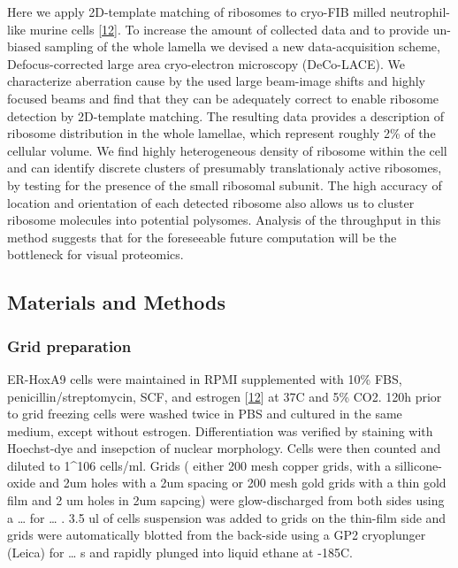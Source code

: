 \documentclass[
]{article}
\begin{document}
Here we apply 2D-template matching of ribosomes to cryo-FIB milled
neutrophil-like murine cells {[}\protect\hyperlink{ref-1B9Vt9eYu}{12}{]}. To increase the
amount of collected data and to provide un-biased sampling of the whole lamella
we devised a new data-acquisition scheme, Defocus-corrected large area
cryo-electron microscopy (DeCo-LACE). We characterize aberration cause by the
used large beam-image shifts and highly focused beams and find that they can be
adequately correct to enable ribosome detection by 2D-template matching. The
resulting data provides a description of ribosome distribution in the whole
lamellae, which represent roughly 2\% of the cellular volume. We find highly
heterogeneous density of ribosome within the cell and can identify discrete
clusters of presumably translationaly active ribosomes, by testing for the
presence of the small ribosomal subunit. The high accuracy of location and
orientation of each detected ribosome also allows us to cluster ribosome
molecules into potential polysomes. Analysis of the throughput in this method
suggests that for the foreseeable future computation will be the bottleneck for
visual proteomics.

\hypertarget{materials-and-methods}{%
\subsection{Materials and Methods}\label{materials-and-methods}}

\hypertarget{grid-preparation}{%
\subsubsection{Grid preparation}\label{grid-preparation}}

ER-HoxA9 cells were maintained in RPMI supplemented with 10\% FBS,
penicillin/streptomycin, SCF, and estrogen {[}\protect\hyperlink{ref-1B9Vt9eYu}{12}{]} at
37C and 5\% CO2. 120h prior to grid freezing cells were washed twice in PBS and
cultured in the same medium, except without estrogen. Differentiation was
verified by staining with Hoechst-dye and insepction of nuclear morphology.
Cells were then counted and diluted to 1\^{}106 cells/ml. Grids ( either 200 mesh
copper grids, with a sillicone-oxide and 2um holes with a 2um spacing or 200
mesh gold grids with a thin gold film and 2 um holes in 2um sapcing) were
glow-discharged from both sides using a \ldots{} for \ldots{} . 3.5 ul of cells suspension
was added to grids on the thin-film side and grids were automatically blotted
from the back-side using a GP2 cryoplunger (Leica) for \ldots{} s and rapidly plunged
into liquid ethane at -185C.
\end{document}
